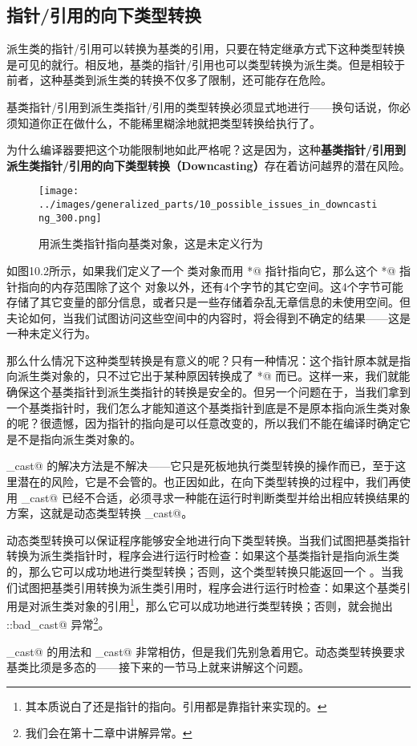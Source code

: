 \subsection*{指针/引用的向下类型转换}
派生类的指针/引用可以转换为基类的引用，只要在特定继承方式下这种类型转换是可见的就行。相反地，基类的指针/引用也可以类型转换为派生类。但是相较于前者，这种基类到派生类的转换不仅多了限制，还可能存在危险。\par
基类指针/引用到派生类指针/引用的类型转换必须显式地进行——换句话说，你必须知道你正在做什么，不能稀里糊涂地就把类型转换给执行了。\par
为什么编译器要把这个功能限制地如此严格呢？这是因为，这种\textbf{基类指针/引用到派生类指针/引用的向下类型转换（Downcasting）}存在着访问越界的潜在风险。\par
\begin{figure}[htbp]
    \centering
    \texttt{[image: ../images/generalized\_parts/10\_possible\_issues\_in\_downcasting\_300.png]}
    \caption{用派生类指针指向基类对象，这是未定义行为}
\end{figure}
如图10.2所示，如果我们定义了一个 \lstinline@Base@ 类对象而用 \lstinline@Derived*@ 指针指向它，那么这个 \lstinline@Derived*@ 指针指向的内存范围除了这个 \lstinline@Base@ 对象以外，还有4个字节的其它空间。这4个字节可能存储了其它变量的部分信息，或者只是一些存储着杂乱无章信息的未使用空间。但夫论如何，当我们试图访问这些空间中的内容时，将会得到不确定的结果——这是一种未定义行为。\par
那么什么情况下这种类型转换是有意义的呢？只有一种情况：这个指针原本就是指向派生类对象的，只不过它出于某种原因转换成了 \lstinline@Base*@ 而已。这样一来，我们就能确保这个基类指针到派生类指针的转换是安全的。但另一个问题在于，当我们拿到一个基类指针时，我们怎么才能知道这个基类指针到底是不是原本指向派生类对象的呢？很遗憾，因为指针的指向是可以任意改变的，所以我们不能在编译时确定它是不是指向派生类对象的。\par
\lstinline@static_cast@ 的解决方法是不解决——它只是死板地执行类型转换的操作而已，至于这里潜在的风险，它是不会管的。也正因如此，在向下类型转换的过程中，我们再使用 \lstinline@static_cast@ 已经不合适，必须寻求一种能在运行时判断类型并给出相应转换结果的方案，这就是动态类型转换 \lstinline@dynamic_cast@。\par
动态类型转换可以保证程序能够安全地进行向下类型转换。当我们试图把基类指针转换为派生类指针时，程序会进行运行时检查：如果这个基类指针是指向派生类的，那么它可以成功地进行类型转换；否则，这个类型转换只能返回一个 \lstinline@nullptr@。当我们试图把基类引用转换为派生类引用时，程序会进行运行时检查：如果这个基类引用是对派生类对象的引用\footnote{其本质说白了还是指针的指向。引用都是靠指针来实现的。}，那么它可以成功地进行类型转换；否则，就会抛出 \lstinline@std::bad_cast@ 异常\footnote{我们会在第十二章中讲解异常。}。\par
\lstinline@dynamic_cast@ 的用法和 \lstinline@static_cast@ 非常相仿，但是我们先别急着用它。动态类型转换要求基类比须是多态的——接下来的一节马上就来讲解这个问题。\par
